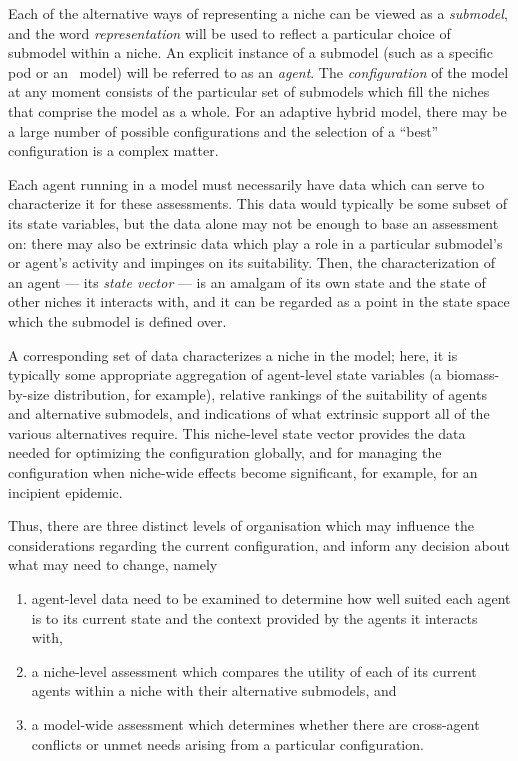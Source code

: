 Each of the alternative ways of representing a niche can be viewed as
a \emph{sub\-model}, and the word \emph{rep\-re\-sen\-ta\-tion} will
be used to reflect a particular choice of sub\-model within a niche.
An explicit instance of a sub\-model (such as a specific pod or an
\SD\ model) will be referred to as an \emph{agent}.  The
\emph{con\-fig\-ur\-a\-tion} of the model at any moment consists of
the particular set of sub\-models which fill the niches that comprise
the model as a whole. For an adaptive hybrid model, there may be a
large number of possible con\-fig\-ur\-a\-tions and the selection of a
``best'' con\-fig\-ur\-a\-tion is a complex matter.

Each agent running in a model must necessarily have data which can
serve to characterize it for these assessments. This data would
typically be some subset of its state variables, but the data alone
may not be enough to base an assessment on: there may also be
extrinsic data which play a role in a particular sub\-model's or agent's
activity and impinges on its suitability. Then, the characterization
of an agent --- its \emph{state vector} --- is an amalgam of its own
state and the state of other niches it interacts with, and it can be
regarded as a point in the state space which the sub\-model is defined
over. 

A corresponding set of data characterizes a niche in the model; here,
it is typically some appropriate aggregation of agent-level state
variables (a biomass-by-size distribution, for example), relative
rankings of the suitability of agents and alternative sub\-models, and
indications of what extrinsic support all of the various alternatives
require. This niche-level state vector provides the data needed for
optimizing the con\-fig\-ur\-a\-tion globally,
and for managing the con\-fig\-ur\-a\-tion when niche-wide effects
become significant, for example, for an incipient epidemic.

Thus, there are three distinct levels of organisation which may
influence the considerations regarding the current configur\-ation, and
inform any decision about what may need to change, namely
\begin{enumerate}
\item agent-level data need to be examined to determine how well
  suited each agent is to its current state and the context provided
  by the agents it interacts with,
\item a niche-level assessment which compares the utility of each of
  its current agents within a niche with their alternative sub\-models,
  and
\item a model-wide assessment which determines whether there are
  cross-agent conflicts or unmet needs arising from a particular
  con\-fig\-ur\-a\-tion.
\end{enumerate}

